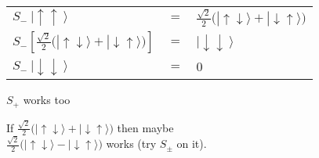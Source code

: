 \documentclass[12pt]{article}
\begin{document}
\vspace{15pt} \noindent
\begin{minipage}{.40\textwidth}
    {\setlength{\tabcolsep}{3pt}
    \begin{tabular}{l c l}
        \(S_-  \ | \uparrow \uparrow \ \rangle \)
            & \(=\)
            & \( \tfrac{\sqrt{2}}{2} \big( | {\scriptstyle \uparrow \downarrow} \rangle +
                | {\scriptstyle \downarrow \uparrow} \rangle \big) \) \\[5pt]
        \( S_- \left[ \tfrac{\sqrt{2}}{2} \big( | {\scriptstyle \uparrow \downarrow} \rangle +
            | {\scriptstyle \downarrow \uparrow} \rangle \big) \right] \)
            & \(=\)
            & \( | \downarrow \downarrow \ \rangle \) \\[5pt]
        \( S_- \ | \downarrow \downarrow \ \rangle \)
        & \(=\) 
        & \(0\)
    \end{tabular} }

    \vspace{20pt}
    \(S_+\) works too

    \vspace{20pt}
    If \( \tfrac{\sqrt{2}}{2} \big( | {\scriptstyle \uparrow \downarrow} \rangle +
        | {\scriptstyle \downarrow \uparrow} \rangle \big) \) then maybe \\
    \( \tfrac{\sqrt{2}}{2} \big( | {\scriptstyle \uparrow \downarrow} \rangle -
        | {\scriptstyle \downarrow \uparrow} \rangle \big) \) works (try \(S_\pm\) on it).
\end{minipage}
\hfill\vline\hfill
\end{document}
